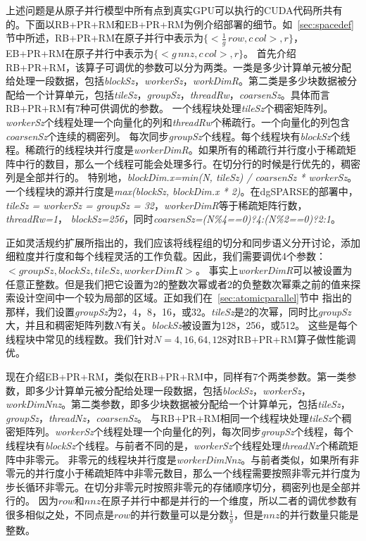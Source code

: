 上述问题是从原子并行模型中所有点到真实GPU可以执行的CUDA代码所共有的。下面以RB+PR+RM和EB+PR+RM为例介绍部署的细节。如~\ref{sec:spacedef}节中所述，RB+PR+RM在原子并行中表示为$\{<\frac{1}{g}\,row, c\,col>,r\}$，
EB+PR+RM在原子并行中表示为$\{<g\,nnz , c\,col>,r\}$。
首先介绍RB+PR+RM，该算子可调优的参数可以分为两类。一类是多少计算单元被分配给处理一段数据，包括\textit{blockSz}，\textit{workerSz}，\textit{workDimR}。第二类是多少块数据被分配给一个计算单元，包括\textit{tileSz}，\textit{groupSz}，\textit{threadRw}，\textit{coarsenSz}。具体而言RB+PR+RM有7种可供调优的参数。
一个线程块处理\textit{tileSz}个稠密矩阵列。\textit{workerSz}个线程处理一个向量化的列和\textit{threadRw}个稀疏行。一个向量化的列包含\textit{coarsenSz}个连续的稠密列。
每次同步\textit{groupSz}个线程。每个线程块有\textit{blockSz}个线程。稀疏行的线程块并行度是\textit{workerDimR}。如果所有的稀疏行并行度小于稀疏矩阵中行的数目，那么一个线程可能会处理多行。在切分行的时候是行优先的，稠密列是全部并行的。
特别地，\textit{blockDim.x=min(N, tileSz) / coarsenSz * workerSz}。一个线程块的源并行度是\textit{max(blockSz, blockDim.x * 2)}。在dgSPARSE的部署中，\textit{tileSz = workerSz = groupSz = 32}，\textit{workerDimR}等于稀疏矩阵行数，\textit{threadRw=1}，
\textit{blockSz=256}，同时\textit{coarsenSz=(N\%4==0)?4:(N\%2==0)?2:1}。

正如灵活规约扩展所指出的，我们应该将线程组的切分和同步语义分开讨论，添加细粒度并行度和每个线程灵活的工作负载。因此，我们需要调优4个参数：$<groupSz, blockSz, tileSz, workerDimR>$。
事实上\textit{workerDimR}可以被设置为任意正整数。但是我们把它设置为2的整数次幂或者2的负整数次幂乘之前的值来探索设计空间中一个较为局部的区域。正如我们在~\ref{sec:atomicparallel}节中
指出的那样，我们设置\textit{groupSz}为2，4，8，16，或32。\textit{tileSz}是2的次幂，同时比\textit{groupSz}大，并且和稠密矩阵列数$N$有关。\textit{blockSz}被设置为128，256，或512。
这些是每个线程块中常见的线程数。我们针对$N=4,16,64,128$对RB+PR+RM算子做性能调优。

现在介绍EB+PR+RM，类似在RB+PR+RM中，同样有7个两类参数。第一类参数，即多少计算单元被分配给处理一段数据，包括\textit{blockSz}，\textit{workerSz}，\textit{workDimNnz}。第二类参数，即多少块数据被分配给一个计算单元，包括\textit{tileSz}，\textit{groupSz}，\textit{threadNz}，\textit{coarsenSz}。
与RB+PR+RM相同一个线程块处理\textit{tileSz}个稠密矩阵列。\textit{workerSz}个线程处理一个向量化的列，每次同步\textit{groupSz}个线程，每个线程块有\textit{blockSz}个线程。与前者不同的是，\textit{workerSz}个线程处理\textit{threadNz}个稀疏矩阵中非零元。
非零元的线程块并行度是\textit{workerDimNnz}。与前者类似，如果所有非零元的并行度小于稀疏矩阵中非零元数目，那么一个线程需要按照非零元并行度为步长循环非零元。在切分非零元时按照非零元的存储顺序切分，稠密列也是全部并行的。
因为$row$和$nnz$在原子并行中都是并行的一个维度，所以二者的调优参数有很多相似之处，不同点是$row$的并行数量可以是分数$\frac{1}{g}$，但是$nnz$的并行数量只能是整数。


